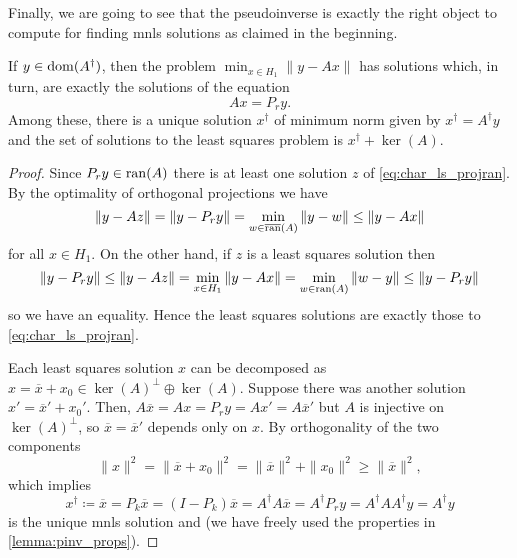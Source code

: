 \begin{lemma}
Finally, we are going to see that the pseudoinverse is exactly the 
right object to compute for finding mnls solutions as claimed in 
the beginning.
\begin{thm}
\label{thm:char_ls_solution}
    If $y \in \operatorname{dom}(A^\dagger)$, then the problem 
    $\min_{x \in H_1} \| y - Ax \|$ has solutions 
    which, in turn, are exactly the solutions of the equation
    \begin{equation} \label{eq:char_ls_projran}
        Ax = P_r y.
    \end{equation}
    Among these, there is a unique solution $x^\dagger$ of minimum 
    norm given by $x^\dagger = A^\dagger y$ and the set of solutions 
    to the least squares problem is $x^\dagger + \ker(A)$.
\end{thm}
\begin{proof}
    Since $P_r y \in \operatorname{ran}(A)$ there is at least one solution $z$ of 
    \cref{eq:char_ls_projran}.
    By the optimality of orthogonal projections we have
    \begin{equation*}
        \|y-Az\| = \|y - P_r y\| 
        = \min_{w \in \overline{\operatorname{ran}}(A)} \|y-w\| \leq \|y - Ax\|
    \end{equation*}
    for all $x \in H_1$.
    On the other hand, if $z$ is a least squares solution then
    \begin{equation*}
        \|y-P_r y\| \leq \|y - Az\| = \min_{x \in H_1} \|y-Ax\|
        = \min_{w \in \operatorname{ran}(A)} \|w - y\|
        \leq \|y-P_r y\|
    \end{equation*}
    so we have an equality.
    Hence the least squares solutions are exactly those to 
    \cref{eq:char_ls_projran}.
    
    Each least squares solution $x$ can be decomposed as 
    $x = \overline x + x_0 \in \ker(A)^\perp \oplus \ker(A)$.
    Suppose there was another solution $x' = \overline x' + x_0'$. 
    Then, $A \overline x = A x = P_r y = A x' = A \overline x'$
    but $A$ is injective on $\ker(A)^\perp$, so 
    $\overline x = \overline x'$ depends only on $x$.
    By orthogonality of the two components
    \begin{equation*}
        \| x \|^2 = \|\overline x + x_0\|^2 
        = \|\overline x\|^2 + \|x_0\|^2 \geq \|\overline x\|^2,
    \end{equation*}
    which implies
    \begin{equation*}
        x^\dagger \coloneqq \overline x = P_k \overline x 
        = (I - P_k) \overline x = A^\dagger A \overline x 
        = A^\dagger P_r y = A^\dagger A A^\dagger y 
        = A^\dagger y
    \end{equation*}
    is the unique mnls solution and 
    (we have freely used the properties in \cref{lemma:pinv_props}).
\end{proof}


\end{lemma}
